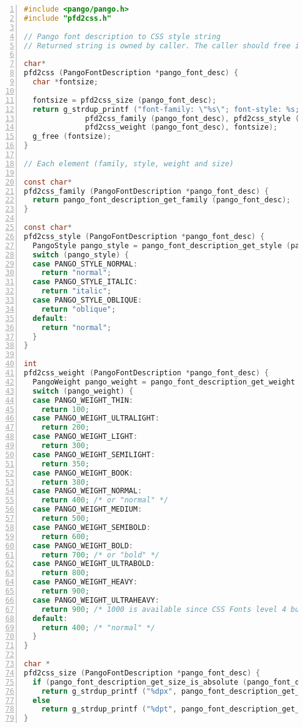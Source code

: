 \begin{lstlisting}[language=C, numbers=left]
#include <pango/pango.h>
#include "pfd2css.h"

// Pango font description to CSS style string
// Returned string is owned by caller. The caller should free it when it is useless.

char*
pfd2css (PangoFontDescription *pango_font_desc) {
  char *fontsize;

  fontsize = pfd2css_size (pango_font_desc);
  return g_strdup_printf ("font-family: \"%s\"; font-style: %s; font-weight: %d; font-size: %s;",
              pfd2css_family (pango_font_desc), pfd2css_style (pango_font_desc),
              pfd2css_weight (pango_font_desc), fontsize);
  g_free (fontsize); 
}

// Each element (family, style, weight and size)

const char*
pfd2css_family (PangoFontDescription *pango_font_desc) {
  return pango_font_description_get_family (pango_font_desc);
}

const char*
pfd2css_style (PangoFontDescription *pango_font_desc) {
  PangoStyle pango_style = pango_font_description_get_style (pango_font_desc);
  switch (pango_style) {
  case PANGO_STYLE_NORMAL:
    return "normal";
  case PANGO_STYLE_ITALIC:
    return "italic";
  case PANGO_STYLE_OBLIQUE:
    return "oblique";
  default:
    return "normal";
  }
}

int
pfd2css_weight (PangoFontDescription *pango_font_desc) {
  PangoWeight pango_weight = pango_font_description_get_weight (pango_font_desc);
  switch (pango_weight) {
  case PANGO_WEIGHT_THIN:
    return 100;
  case PANGO_WEIGHT_ULTRALIGHT:
    return 200;
  case PANGO_WEIGHT_LIGHT:
    return 300;
  case PANGO_WEIGHT_SEMILIGHT:
    return 350;
  case PANGO_WEIGHT_BOOK:
    return 380;
  case PANGO_WEIGHT_NORMAL:
    return 400; /* or "normal" */
  case PANGO_WEIGHT_MEDIUM:
    return 500;
  case PANGO_WEIGHT_SEMIBOLD:
    return 600;
  case PANGO_WEIGHT_BOLD:
    return 700; /* or "bold" */
  case PANGO_WEIGHT_ULTRABOLD:
    return 800;
  case PANGO_WEIGHT_HEAVY:
    return 900;
  case PANGO_WEIGHT_ULTRAHEAVY:
    return 900; /* 1000 is available since CSS Fonts level 4 but GTK currently supports level 3. */
  default:
    return 400; /* "normal" */
  }
}

char *
pfd2css_size (PangoFontDescription *pango_font_desc) {
  if (pango_font_description_get_size_is_absolute (pango_font_desc))
    return g_strdup_printf ("%dpx", pango_font_description_get_size (pango_font_desc) / PANGO_SCALE);
  else
    return g_strdup_printf ("%dpt", pango_font_description_get_size (pango_font_desc) / PANGO_SCALE);
}
\end{lstlisting}

